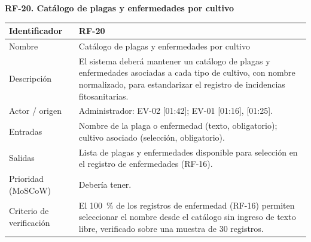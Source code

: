 \documentclass[12pt,a4paper]{article}
\begin{document}
\begin{minipage}{\linewidth}
\bigskip
\noindent\textbf{RF-20. Catálogo de plagas y enfermedades por cultivo}
\label{tab:RF-20}

\begin{center}
\begin{tabular}{|p{3.5cm}|p{10.7cm}|}
\hline
Identificador & RF-20 \\
\hline
Nombre & Catálogo de plagas y enfermedades por cultivo \\
\hline
Descripción & El sistema deberá mantener un catálogo de plagas y enfermedades asociadas a cada tipo de cultivo, con nombre normalizado, para estandarizar el registro de incidencias fitosanitarias. \\
\hline
Actor / origen & Administrador: EV-02 [01:42]; EV-01 [01:16], [01:25]. \\
\hline
Entradas & Nombre de la plaga o enfermedad (texto, obligatorio); cultivo asociado (selección, obligatorio). \\
\hline
Salidas & Lista de plagas y enfermedades disponible para selección en el registro de enfermedades (RF-16). \\
\hline
Prioridad (MoSCoW) & Debería tener. \\
\hline
Criterio de verificación & El 100~\% de los registros de enfermedad (RF-16) permiten seleccionar el nombre desde el catálogo sin ingreso de texto libre, verificado sobre una muestra de 30 registros. \\
\hline
\end{tabular}
\end{center}
\end{minipage}
\end{document}
